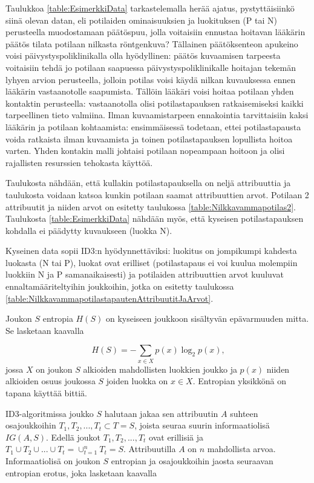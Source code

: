 \documentclass[12pt,finnish]{tktltiki2}
\theoremstyle{definition}
\theoremstyle{remark}
\begin{document}
Taulukkoa \ref{table:EsimerkkiData} tarkastelemalla herää ajatus, pystyttäisiinkö siinä olevan datan, eli potilaiden ominaisuuksien
ja luokituksen (P tai N) perusteella muodostamaan päätöspuu, jolla voitaisiin ennustaa hoitavan lääkärin päätös tilata potilaan nilkasta
röntgenkuva? Tällainen päätöksenteon apukeino voisi päivystyspoliklinikalla olla hyödyllinen:
päätös kuvaamisen tarpeesta voitaisiin tehdä jo potilaan saapuessa päivystyspoliklinikalle hoitajan tekemän
lyhyen arvion perusteella, jolloin potilas voisi käydä nilkan kuvauksessa ennen lääkärin vastaanotolle saapumista.
Tällöin lääkäri voisi hoitaa potilaan yhden kontaktin perusteella: vastaanotolla olisi potilastapauksen ratkaisemiseksi
kaikki tarpeellinen tieto valmiina. Ilman kuvaamistarpeen ennakointia tarvittaisiin kaksi lääkärin ja potilaan
kohtaamista: ensimmäisessä todetaan, ettei potilastapausta voida ratkaista ilman kuvaamista ja toinen potilastapauksen
lopullista hoitoa varten. Yhden kontakin malli johtaisi potilaan nopeampaan hoitoon ja olisi rajallisten resurssien
tehokasta käyttöä.

Taulukosta nähdään, että kullakin potilastapauksella on neljä attribuuttia ja taulukosta voidaan katsoa kunkin potilaan
saamat attribuuttien arvot. Potilaan 2 attribuutit ja niiden arvot on esitetty taulukossa \ref{table:Nilkkavammapotilas2}.
Taulukosta \ref{table:EsimerkkiData} nähdään myös, että kyseisen potilastapauksen kohdalla ei päädytty kuvaukseen (luokka N).

Kyseinen data sopii ID3:n hyödynnettäviksi: luokitus on jompikumpi kahdesta luokasta (N tai P), luokat ovat erilliset (potilastapaus
ei voi kuulua molempiin luokkiin N ja P samanaikaisesti) ja potilaiden attribuuttien arvot kuuluvat ennaltamääriteltyihin joukkoihin,
jotka on esitetty taulukossa \ref{table:NilkkavammapotilastapautenAttribuutitJaArvot}.

Joukon $S$ entropia $H(S)$ on kyseiseen joukkoon sisältyvän epävarmuuden mitta. Se lasketaan
kaavalla

\[ H(S) = -\sum_{x \in X} p(x)\log_2 p(x) \mbox{,}\]
jossa $X$ on joukon $S$ alkioiden mahdollisten luokkien joukko ja $p(x)$ niiden alkioiden osuus
joukossa $S$ joiden luokka on $x \in X$. Entropian yksikkönä on tapana käyttää bittiä.

ID3-algoritmissa joukko $S$ halutaan jakaa sen attribuutin $A$ suhteen osajoukkoihin
$T_1, T_2, ..., T_t \subset T = S$, joista seuraa suurin informaatiolisä $IG(A,S)$.
Edellä joukot $T_1, T_2, ..., T_t$ ovat erillisiä ja 
$T_1\cup T_2\cup ...\cup T_t = \cup_{t=1}^{n}T_t = S$.
Attribuutilla $A$
on $n$ mahdollista arvoa. Informaatiolisä on joukon $S$ entropian ja osajoukkoihin jaosta seuraavan
entropian erotus, joka lasketaan kaavalla
\end{document}
